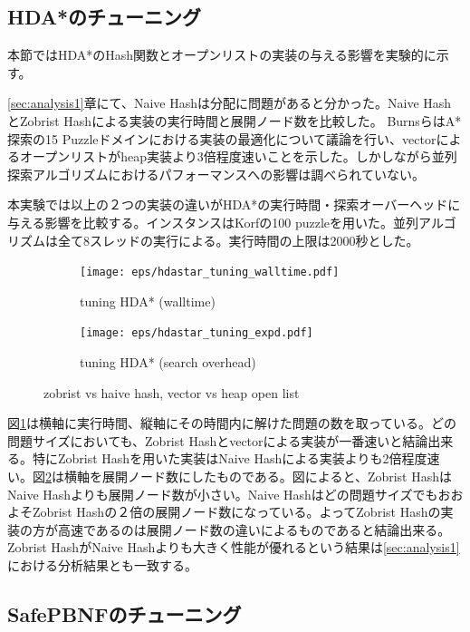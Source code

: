 \documentclass{jsarticle}
\begin{document}
\subsection{HDA*のチューニング}
\label{sec:hdastar_tuning}

本節ではHDA*のHash関数とオープンリストの実装の与える影響を実験的に示す。

\ref{sec:analysis1}章にて、Naive Hashは分配に問題があると分かった。Naive HashとZobrist Hashによる実装の実行時間と展開ノード数を比較した。
BurnsらはA*探索の15 Puzzleドメインにおける実装の最適化について議論を行い、vectorによるオープンリストがheap実装より3倍程度速いことを示した\cite{Burns2012implementing}。しかしながら並列探索アルゴリズムにおけるパフォーマンスへの影響は調べられていない。

本実験では以上の２つの実装の違いがHDA*の実行時間・探索オーバーヘッドに与える影響を比較する。インスタンスはKorfの100 puzzleを用いた\cite{korf1985depth}。並列アルゴリズムは全て8スレッドの実行による。実行時間の上限は2000秒とした。

\begin{figure}
	\centering
	\begin{subfigure}{0.4\columnwidth}
		\texttt{[image: eps/hdastar\_tuning\_walltime.pdf]}
		\caption{tuning HDA* (walltime)}
		\label{fig:hdastar_tuning_walltime}
	\end{subfigure}
	\begin{subfigure}{0.4\columnwidth}
		\texttt{[image: eps/hdastar\_tuning\_expd.pdf]}
		\caption{tuning HDA* (search overhead)}
		\label{fig:hdastar_tuning_expd}
	\end{subfigure}
	\caption{zobrist vs haive hash, vector vs heap open list}
	\label{fig:hdastar_tuning}
\end{figure}

図\ref{fig:hdastar_tuning_walltime}は横軸に実行時間、縦軸にその時間内に解けた問題の数を取っている。どの問題サイズにおいても、Zobrist Hashとvectorによる実装が一番速いと結論出来る。特にZobrist Hashを用いた実装はNaive Hashによる実装よりも2倍程度速い。図\ref{fig:hdastar_tuning_expd}は横軸を展開ノード数にしたものである。図によると、Zobrist HashはNaive Hashよりも展開ノード数が小さい。Naive Hashはどの問題サイズでもおおよそZobrist Hashの２倍の展開ノード数になっている。よってZobrist Hashの実装の方が高速であるのは展開ノード数の違いによるものであると結論出来る。Zobrist HashがNaive Hashよりも大きく性能が優れるという結果は\ref{sec:analysis1}における分析結果とも一致する。


\subsection{SafePBNFのチューニング}
\label{sec:pbnf_tuning}
\end{document}
